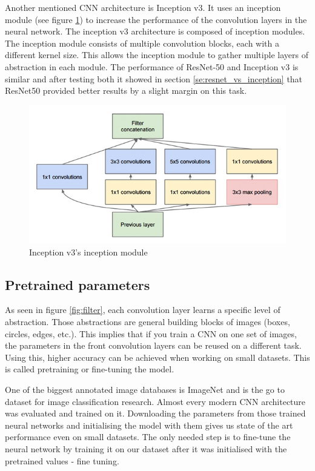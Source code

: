 \documentclass[times, utf8, diplomski]{fer}
\begin{document}
Another mentioned CNN architecture is Inception v3. It uses an inception module (see figure \ref{fig:inception_module}) to increase the performance of the convolution layers in the neural network. The inception v3 architecture is composed of inception modules. The inception module consists of multiple convolution blocks, each with a different kernel size. This allows the inception module to gather multiple layers of abstraction in each module. The performance of ResNet-50 and Inception v3 is similar and after testing both it showed in section \ref{se:resnet_vs_inception} that  ResNet50 provided better results by a slight margin on this task.

\begin{figure}
  \includegraphics[scale=0.7]{figures/inception_module.png}
  \centering
  \caption{Inception v3's inception module}
  \label{fig:inception_module}
\end{figure}


\subsection{Pretrained parameters}
\label{se:pretrained_parameters}
As seen in figure \ref{fig:filter}, each convolution layer learns a specific level of abstraction. Those abstractions are general building blocks of images (boxes, circles, edges, etc.). This implies that if you train a CNN on one set of images, the parameters in the front convolution layers can be reused on a different task. Using this, higher accuracy can be achieved when working on small datasets. This is called pretraining or fine-tuning the model.

One of the biggest annotated image databases is ImageNet \citep{imagenet} and is the go to dataset for image classification research. Almost every modern CNN architecture was evaluated and trained on it. Downloading the parameters from those trained neural networks and initialising the model with them gives us state of the art performance even on small datasets. The only needed step is to fine-tune the neural network by training it on our dataset after it was initialised with the pretrained values - fine tuning.
\end{document}
